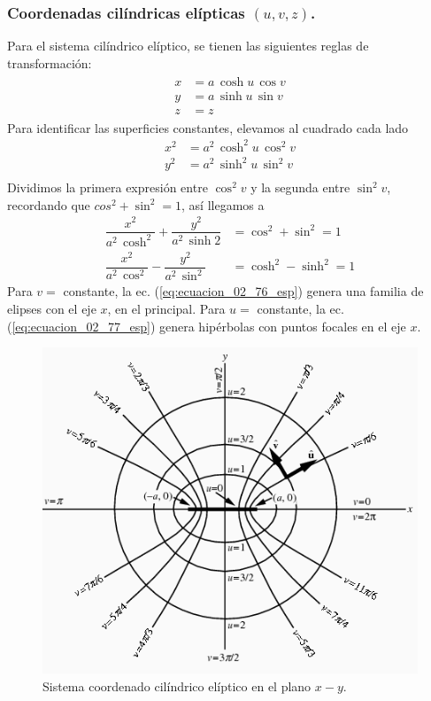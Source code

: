 \subsubsection{Coordenadas cilíndricas elípticas \texorpdfstring{$(u, v, z)$}{(u, v, z)}.}
 
 Para el sistema cilíndrico elíptico, se tienen las siguientes reglas de transformación:
\begin{align}
\begin{aligned}
x &= a \, \cosh u \, \cos v \\
y &= a \, \sinh u \, \sin v \\
z &= z
\end{aligned}
\label{eq:ecuacion_02_73_esp}
\end{align}
Para identificar las superficies constantes, elevamos al cuadrado cada lado
\begin{align}
x^{2} &= a^{2} \, \cosh^{2} u \, \cos^{2} v \label{eq:ecuacion_02_74_esp} \\
y^{2} &= a^{2} \, \sinh^{2} u \, \sin^{2} v \label{eq:ecuacion_02_75_esp} \\ 
\end{align}
Dividimos la primera expresión entre $\cos^{2} v$ y la segunda entre $\sin^{2} v$, recordando que $cos^{2} + \sin^{2} = 1$, así llegamos a
\begin{align}
\dfrac{x^{2}}{a^{2} \, \cosh^{2}} + \dfrac{y^{2}}{a^{2} \, \sinh{2}} &= \cos^{2} + \sin^{2} = 1 \label{eq:ecuacion_02_76_esp}\\[1em]
\dfrac{x^{2}}{a^{2} \, \cos^{2}} - \dfrac{y^{2}}{a^{2} \, \sin^{2}} &= \cosh^{2} - \sinh^{2} = 1 \label{eq:ecuacion_02_77_esp}
\end{align}
Para $v=$ constante, la ec. (\ref{eq:ecuacion_02_76_esp}) genera una familia de elipses con el eje $x$, en el principal. Para $u=$ constante, la ec. (\ref{eq:ecuacion_02_77_esp}) genera hipérbolas con puntos focales en el eje $x$.
\begin{figure}[H]
    \centering
    \includegraphics[scale=0.75]{Imagenes/EllipticCylindricalCoord_1000.png}
    \caption{Sistema coordenado cilíndrico elíptico en el plano $x-y$.}
    \label{fig:figura_coordenada_cilindricas_elipticas}
\end{figure}
